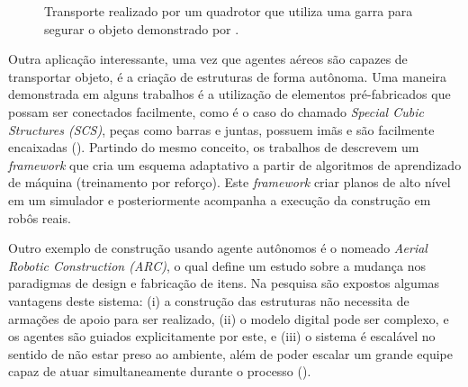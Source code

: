\begin{figure}[h]
  \centering
  \setlength{\fboxsep}{0pt}
  \caption[Transporte realizado por um quadrotor que utiliza uma garra para segurar o objeto]{Transporte realizado por um quadrotor que utiliza uma garra para segurar o objeto demonstrado por \cite{Pounds2011}.}
  \label{fig:pounds_object}
\end{figure}

Outra aplicação interessante, uma vez que agentes aéreos são capazes de transportar objeto, é a criação de estruturas de forma autônoma.
Uma maneira demonstrada em alguns trabalhos é a utilização de elementos pré-fabricados que possam ser conectados facilmente, como é o caso do chamado \emph{Special Cubic Structures (SCS)}, peças como barras e juntas, possuem imãs e são facilmente encaixadas (\cite{Lindsey2011, Lindsey2012}).
Partindo do mesmo conceito, os trabalhos de \cite{BarrosdosSantos2013, BarrosdosSantos2014} descrevem um \emph{framework} que cria um esquema adaptativo a partir de algoritmos de aprendizado de máquina (treinamento por reforço). Este \emph{framework} criar planos de alto nível em um simulador e posteriormente acompanha a execução da construção em robôs reais.

Outro exemplo de construção usando agente autônomos é o nomeado \emph{Aerial Robotic Construction (ARC)}, o qual define um estudo sobre a mudança nos paradigmas de design e fabricação de itens.
Na pesquisa são expostos algumas vantagens deste sistema:
(i) a construção das estruturas não necessita de armações de apoio para ser realizado,
(ii) o modelo digital pode ser complexo, e os agentes são guiados explicitamente por este, e
(iii) o sistema é escalável no sentido de não estar preso ao ambiente, além de poder escalar um grande equipe capaz de atuar simultaneamente durante o processo (\cite{Willmann2012, Augugliaro2014}).


